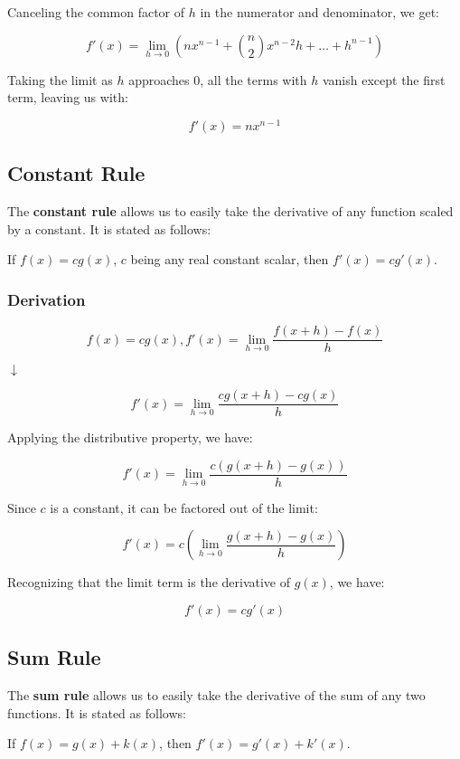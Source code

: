 \documentclass[11pt]{article}
\begin{document}
Canceling the common factor of \(h\) in the numerator and denominator, we get:

\[f'(x) = \lim_{{h \to 0}} \left( nx^{n-1} + \binom{n}{2}x^{n-2}h + \ldots + h^{n-1} \right)\]

Taking the limit as \(h\) approaches 0, all the terms with \(h\) vanish except the first term, leaving us with:

\[f'(x) = nx^{n-1}\]


\subsection{Constant Rule}
The \textbf{constant rule} allows us to easily take the derivative of any function scaled by a constant. It is stated as follows: 

\begin{center}
If $f(x) = cg(x)$, $c$ being any real constant scalar, then $f'(x) = cg'(x)$.
\end{center}

\subsubsection{Derivation}
\[f(x) = cg(x), f'(x) = \lim_{{h \to 0}} \frac{{f(x + h) - f(x)}}{{h}}\]
\begin{center}
$\downarrow$
\end{center}
\[f'(x) = \lim_{{h \to 0}} \frac{{cg(x + h) - cg(x)}}{{h}}\]

Applying the distributive property, we have:

\[f'(x) = \lim_{{h \to 0}} \frac{{c (g(x + h) - g(x))}}{{h}}\]

Since \(c\) is a constant, it can be factored out of the limit:

\[f'(x) = c\left(\lim_{{h \to 0}} \frac{{g(x + h) - g(x)}}{{h}}\right)\]

Recognizing that the limit term is the derivative of \(g(x)\), we have:

\[f'(x) = cg'(x)\]

\subsection{Sum Rule}
The \textbf{sum rule} allows us to easily take the derivative of the sum of any two functions. It is stated as follows: 

\begin{center}
If $f(x) = g(x) + k(x)$, then $f'(x) = g'(x) + k'(x)$.
\end{center}
\end{document}
